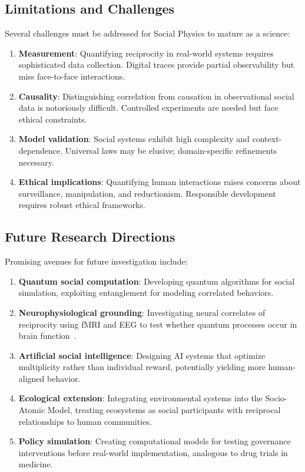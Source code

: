 \documentclass[11pt,a4paper]{article}
\begin{document}
\subsection{Limitations and Challenges}

Several challenges must be addressed for Social Physics to mature as a science:

\begin{enumerate}
    \item \textbf{Measurement}: Quantifying reciprocity in real-world systems requires sophisticated data collection. Digital traces provide partial observability but miss face-to-face interactions.
    \item \textbf{Causality}: Distinguishing correlation from causation in observational social data is notoriously difficult. Controlled experiments are needed but face ethical constraints.
    \item \textbf{Model validation}: Social systems exhibit high complexity and context-dependence. Universal laws may be elusive; domain-specific refinements necessary.
    \item \textbf{Ethical implications}: Quantifying human interactions raises concerns about surveillance, manipulation, and reductionism. Responsible development requires robust ethical frameworks.
\end{enumerate}

\subsection{Future Research Directions}

Promising avenues for future investigation include:

\begin{enumerate}
    \item \textbf{Quantum social computation}: Developing quantum algorithms for social simulation, exploiting entanglement for modeling correlated behaviors.
    \item \textbf{Neurophysiological grounding}: Investigating neural correlates of reciprocity using fMRI and EEG to test whether quantum processes occur in brain function~\cite{penrose1994,wendt2015}.
    \item \textbf{Artificial social intelligence}: Designing AI systems that optimize multiplicity rather than individual reward, potentially yielding more human-aligned behavior.
    \item \textbf{Ecological extension}: Integrating environmental systems into the Socio-Atomic Model, treating ecosystems as social participants with reciprocal relationships to human communities.
    \item \textbf{Policy simulation}: Creating computational models for testing governance interventions before real-world implementation, analogous to drug trials in medicine.
\end{enumerate}
\end{document}
